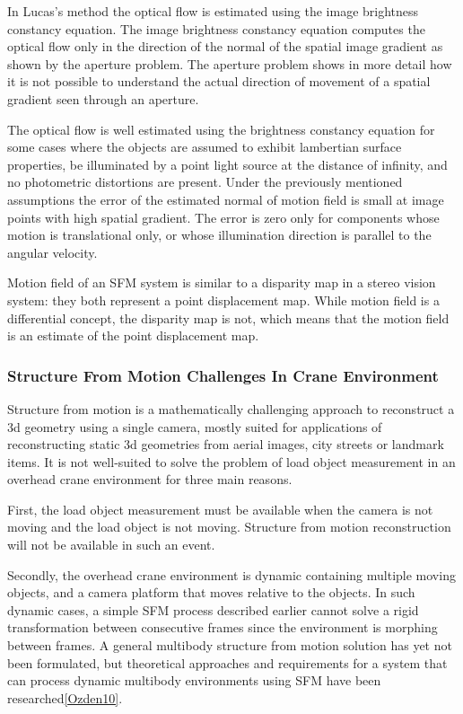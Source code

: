 \documentclass[12pt,a4paper,oneside,pdftex]{report}
\begin{document}
{In Lucas's method the optical flow is estimated using the image brightness constancy equation. The image brightness constancy equation computes the optical flow only in the direction of the normal of the spatial image gradient as shown by the aperture problem. The aperture problem shows in more detail how it is not possible to understand the actual direction of movement of a spatial gradient seen through an aperture.  

The optical flow is well estimated using the brightness constancy equation for some cases where the objects are assumed to exhibit lambertian surface properties, be illuminated by a point light source at the distance of infinity, and  no photometric distortions are present. Under the previously mentioned assumptions the error of the estimated normal of motion field is small at image points with high spatial gradient. The error is zero only for components whose motion is translational only, or whose illumination direction is parallel to the angular velocity. 

Motion field of an SFM system is similar to a disparity map in a stereo vision system: they both represent a point displacement map. While motion field is a differential concept, the disparity map is not, which means that the motion field is an estimate of the point displacement map.

\subsubsection{Structure From Motion Challenges In Crane Environment}
\label{subsubsection:structure_from_motion_challenges_in_crane_environment}

Structure from motion is a mathematically challenging approach to reconstruct a 3d geometry using a single camera, mostly suited for applications of reconstructing static 3d geometries from aerial images, city streets or landmark items. It is not well-suited to solve the problem of load object measurement in an overhead crane environment for three main reasons.

First, the load object measurement must be available when the camera is not moving and the load object is not moving. Structure from motion reconstruction will not be available in such an event. 

Secondly, the overhead crane environment is dynamic containing multiple moving objects, and a camera platform that moves relative to the objects. In such dynamic cases, a simple SFM process described earlier cannot solve a rigid transformation between consecutive frames since the environment is morphing between frames. A general multibody structure from motion solution has yet not been formulated, but theoretical approaches and requirements for a system that can process dynamic multibody environments using SFM have been researched\ref{Ozden10}.

}
\end{document}
